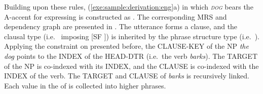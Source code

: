 





Building upon these rules, (\ref{exe:sample:derivation:eng}a) in which
\textit{\textsc{dog}} bears the A-accent for expressing
 is constructed as
. The corresponding MRS and
dependency graph are presented in .  The
utterance forms a clause, and the clausal type
(i.e.\  imposing [SF ]) is
inherited by the phrase structure type
(i.e.\ ). Applying the constraint on
 presented before, the CLAUSE-KEY of the NP \textit{the
  dog} points to the INDEX of the HEAD-DTR (i.e.\ the verb
\textit{barks}). The TARGET of the NP is
co-indexed with its INDEX, and the CLAUSE is co-indexed with the INDEX
of the verb. The TARGET and CLAUSE of \textit{barks} is recursively
linked. Each value in the  of  is collected
into higher phrases.



